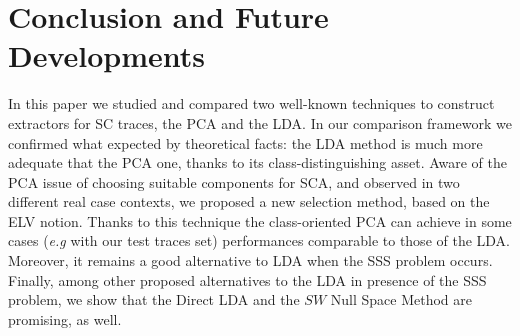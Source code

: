\section{Conclusion and Future Developments}\label{sec:conclusions}

In this paper we studied and compared two well-known techniques to construct extractors for SC traces, the PCA and the LDA. In our comparison framework we confirmed what expected by theoretical facts: the LDA method is much more adequate that the PCA one, thanks to its class-distinguishing asset. Aware of the PCA issue of choosing suitable components for SCA, and observed in two different real case contexts, we proposed a new selection method, based on the ELV notion. Thanks to this technique the class-oriented PCA can achieve in some cases ({\em e.g} with our test traces set) performances comparable to those of the LDA. Moreover, it remains a good alternative to LDA when the SSS problem occurs. Finally, among other proposed alternatives to the LDA in presence of the SSS problem, we show that the Direct LDA and the $SW$ Null Space Method are promising, as well.


